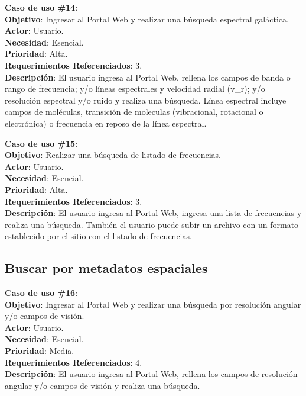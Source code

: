 \noindent\textbf{Caso de uso \#14}: \\
\textbf{Objetivo}: Ingresar al Portal Web y realizar una búsqueda espectral galáctica. \\
\textbf{Actor}: Usuario.\\
\textbf{Necesidad}: Esencial.\\
\textbf{Prioridad}: Alta.\\
\textbf{Requerimientos Referenciados}: 3. \\
\textbf{Descripción}: El usuario ingresa al Portal Web, rellena los campos de banda o rango de frecuencia;  y/o líneas espectrales y velocidad radial (v\_r); y/o resolución espectral y/o ruido y realiza una búsqueda.  Línea espectral incluye campos de moléculas, transición de moleculas (vibracional, rotacional o electrónica) o frecuencia en reposo de la línea espectral.
\vspace{1.0cm}

\noindent\textbf{Caso de uso \#15}: \\
\textbf{Objetivo}: Realizar una búsqueda de listado de frecuencias. \\
\textbf{Actor}: Usuario.\\
\textbf{Necesidad}: Esencial.\\
\textbf{Prioridad}: Alta.\\
\textbf{Requerimientos Referenciados}: 3. \\
\textbf{Descripción}: El usuario ingresa al Portal Web, ingresa una lista de frecuencias y realiza una búsqueda. También el usuario puede subir un archivo con un formato establecido por el sitio con el listado de frecuencias.
\vspace{1.0cm}

\subsection{Buscar por metadatos espaciales}
\noindent\textbf{Caso de uso \#16}: \\
\textbf{Objetivo}: Ingresar al Portal Web y realizar una búsqueda por resolución angular y/o campos de visión. \\
\textbf{Actor}: Usuario.\\
\textbf{Necesidad}: Esencial.\\
\textbf{Prioridad}: Media.\\
\textbf{Requerimientos Referenciados}: 4. \\
\textbf{Descripción}: El usuario ingresa al Portal Web, rellena los campos de resolución angular y/o campos de visión y realiza una búsqueda.
\vspace{1.0cm}

